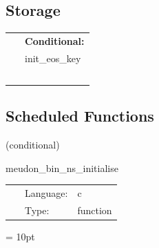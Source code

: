 \subsection*{Storage}

\hspace{5mm}

 \begin{tabular*}{160mm}{ll} 
~& {\bf Conditional:} \\ 
~ &  init\_eos\_key\\ 
~ & ~\\ 
\end{tabular*} 


\subsection*{Scheduled Functions}
\vspace{5mm}

   (conditional) 

\hspace{5mm} meudon\_bin\_ns\_initialise 

\hspace{5mm}{\it set up binary neutron star initial data } 


\hspace{5mm}

 \begin{tabular*}{160mm}{cll} 
~ & Language:  & c \\ 
~ & Type:  & function \\ 
\end{tabular*} 



\vspace{5mm}\parskip = 10pt 

